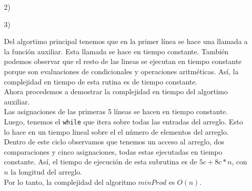 \documentclass[a4paper, 12pt]{report}
\begin{document}
\begin{enumerate}
{\begin{enumerate}
{    }
    \item[2)]{}
    \item[3)]{Del algortimo principal tenemos que en la primer línea se hace una
        llamada a la función auxiliar. Esta llamada se hace en tiempo constante.
        También podemos observar que el resto de las lineas se ejecutan en
        tiempo constante porque son evaluaciones de condicionales y operaciones
        aritméticas. Así, la complejidad en tiempo de esta rutina es de
        tiempo constante.\\
        Ahora procedemos a demostrar la complejidad en tiempo del algortimo
        auxiliar.\\
        Las asignaciones de las primeras 5 líneas se hacen en tiempo constante.
        Luego, tenemos el \texttt{while} que itera sobre todas las entradas del
        arreglo. Esto lo hace en un tiempo lineal sobre el el número de
        elementos del arreglo. Dentro de este ciclo observamos que tenemos un
        acceso al arreglo, dos comparaciones y cinco asignaciones, todas estas
        ejecutadas en tiempo constante. Así, el tiempo de ejecución de esta
        subrutina es de $5c+8c*n$, con $n$ la longitud del arreglo.\\
        Por lo tanto, la complejidad del algoritmo $minProd$ es $O(n)$.

    }
\end{enumerate}
}
\end{enumerate}
\end{document}
